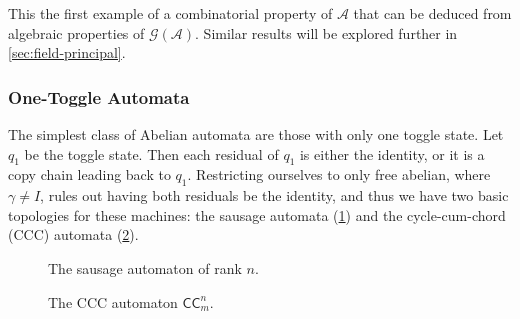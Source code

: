 \documentclass[12pt, letterpaper]{article}
\newcommand{\A}{\mathcal A}
\newcommand{\CC}{\mathsf{CC}}
\newcommand{\gp}{\mathcal G}
\begin{document}
This the first example of a combinatorial property of $\A$ that can be deduced
from algebraic properties of $\gp(\A)$. Similar results will be explored
further in \cref{sec:field-principal}.

\subsubsection{One-Toggle Automata}
The simplest class of Abelian automata are those with only one toggle state.
Let $q_1$ be the toggle state. Then each residual of $q_1$ is either the
identity, or it is a copy chain leading back to $q_1$.  Restricting ourselves
to only free abelian, where $\gamma \ne I$, rules out having both residuals be
the identity, and thus we have two basic topologies for these machines: the
sausage automata (\cref{fig:add-n}) and the cycle-cum-chord (CCC) automata
(\cref{fig:ccc-n-m}).

\begin{figure}
    \centering
    \caption{The sausage automaton of rank $n$.}
    \label{fig:add-n}
\end{figure}

\begin{figure}
    \centering
    \caption{The CCC automaton $\CC^n_m$.}
    \label{fig:ccc-n-m}
\end{figure}
\end{document}
